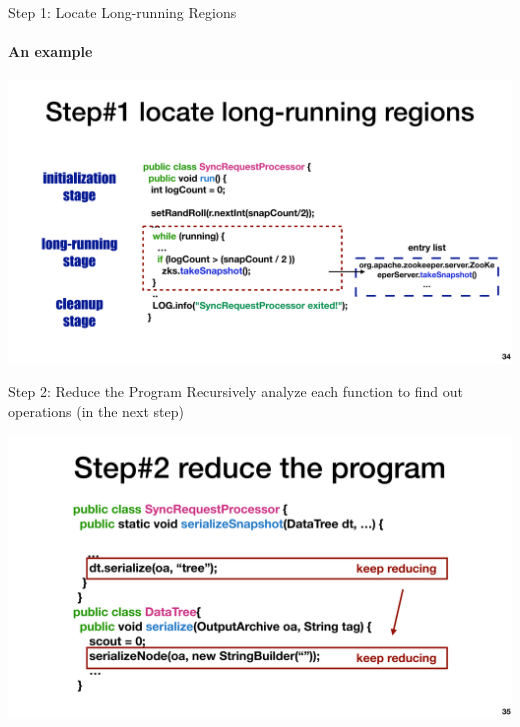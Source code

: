 \documentclass[aspectratio=169]{beamer}
\newcommand{\red}[1]{{\color{red}{#1}}}
\begin{document}
\begin{frame}{Step 1: Locate Long-running Regions}
    \framesubtitle{An example}
    \begin{center}
        \includegraphics[width=.9\textwidth]{fig/long-run}
    \end{center}
\end{frame}

\begin{frame}{Step 2: Reduce the Program}
    Recursively analyze each function to find out \red{vulnerable} operations (in the next step)
    \begin{center}
        \includegraphics[width=.8\textwidth]{fig/rec-reduce}
    \end{center}
\end{frame}
\end{document}
